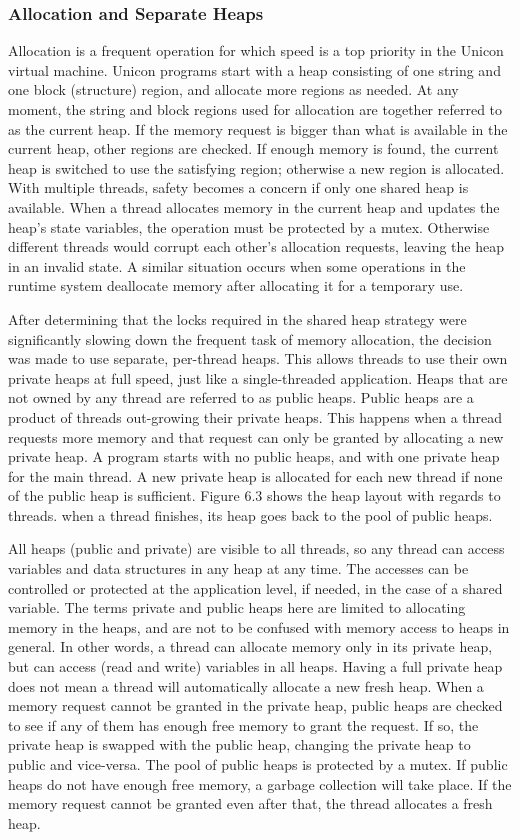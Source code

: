 \subsubsection{Allocation and Separate Heaps}
Allocation is a frequent operation for which speed is a top priority in the
Unicon virtual machine.  Unicon programs start with a heap consisting of
one string and one block (structure) region, and allocate more regions as
needed. At any moment, the string and block regions used for allocation are
together referred to as the current heap. If the memory request is bigger
than what is available in the current heap, other regions are checked. If
enough memory is found, the current heap is switched to use the satisfying
region; otherwise a new region is allocated.  With multiple threads, safety
becomes a concern if only one shared heap is available.  When a thread
allocates memory in the current heap and updates the heap's state
variables, the operation must be protected by a mutex. Otherwise different
threads would corrupt each other's allocation requests, leaving the heap in
an invalid state. A similar situation occurs when some operations in the
runtime system deallocate memory after allocating it for a temporary use.

After determining that the locks required in the shared heap strategy were
significantly slowing down the frequent task of memory allocation, the
decision was made to use separate, per-thread heaps.  This allows threads
to use their own private heaps at full speed, just like a single-threaded
application.  Heaps that are not owned by any thread are referred to as
public heaps. Public heaps are a product of threads out-growing their
private heaps. This happens when a thread requests more memory and that
request can only be granted by allocating a new private heap. A program
starts with no public heaps, and with one private heap for the main
thread. A new private heap is allocated for each new thread if none of the
public heap is sufficient. {\color {red} Figure 6.3} shows the heap layout
with regards to threads. when a thread finishes, its heap goes back to the
pool of public heaps.

All heaps (public and private) are visible to all threads, so any thread can access variables
and data structures in any heap at any time. The accesses can be controlled or protected at the
application level, if needed, in the case of a shared variable. The terms private and public heaps
here are limited to allocating memory in the heaps, and are not to be confused with memory access
to heaps in general. In other words, a thread can allocate memory only in its private heap,
but can access (read and write) variables in all heaps.
Having a full private heap does not mean a thread will automatically allocate a new fresh heap.
When a memory request cannot be granted in the private heap, public heaps are checked to see if
any of them has enough free memory to grant the request. If so, the private heap is swapped with
the public heap, changing the private heap to public and vice-versa. The pool of public heaps is
protected by a mutex. If public heaps do not have enough free memory, a garbage collection will
take place. If the memory request cannot be granted even after that, the thread allocates a fresh heap.

